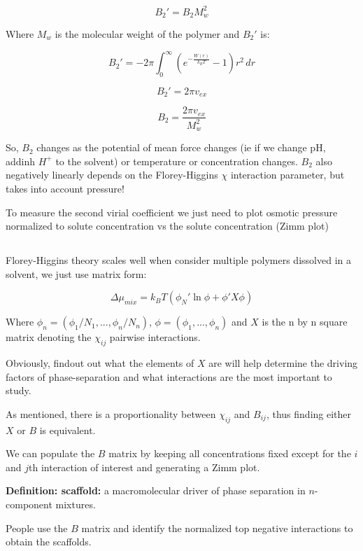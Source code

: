 \documentclass{article}
\begin{document}
\[B_2'=B_2M_w^2\]

Where $M_w$ is the molecular weight of the polymer and $B_2'$ is:

\[B_2'=-2\pi\int_0^{\infty}\left(e^{-\frac{W(r)}{k_B T}}-1\right) r^2\,dr\]

\[B_2'=2\pi v_{ex}\]

\[B_2 = \frac{2\pi v_{ex}}{M_w^2}\]

So, $B_2$ changes as the potential of mean force changes (ie if we change pH, addinh $H^+$ to the solvent) or temperature or concentration changes. $B_2$ also negatively linearly depends on the Florey-Higgins $\chi$ interaction parameter, but takes into account pressure!

To measure the second virial coefficient we just need to plot osmotic pressure normalized to solute concentration vs the solute concentration (Zimm plot)

\subsection{}

Florey-Higgins theory scales well when consider multiple polymers dissolved in a solvent, we just use matrix form:

\[\Delta \mu_{mix}=k_BT(\phi_N'\ln \phi+\phi' X \phi)\]


Where $\phi_n=(\phi_1/N_1,...,\phi_n/N_n)$, $\phi=(\phi_1,...,\phi_n)$ and $X$ is the n by n square matrix denoting the $\chi_{ij}$ pairwise interactions.

Obviously, findout out what the elements of $X$ are will help determine the driving factors of phase-separation and what interactions are the most important to study.

As mentioned, there is a proportionality between $\chi_{ij}$ and $B_{ij}$, thus finding either $X$ or $B$ is equivalent.

We can populate the $B$ matrix by keeping all concentrations fixed except for the $i$ and $j$th interaction of interest and generating a Zimm plot.

\textbf{Definition: scaffold: } a macromolecular driver of phase separation in $n$-component mixtures.

People use the $B$ matrix and identify the normalized top negative interactions to obtain the scaffolds.

\subsection{}
\end{document}
